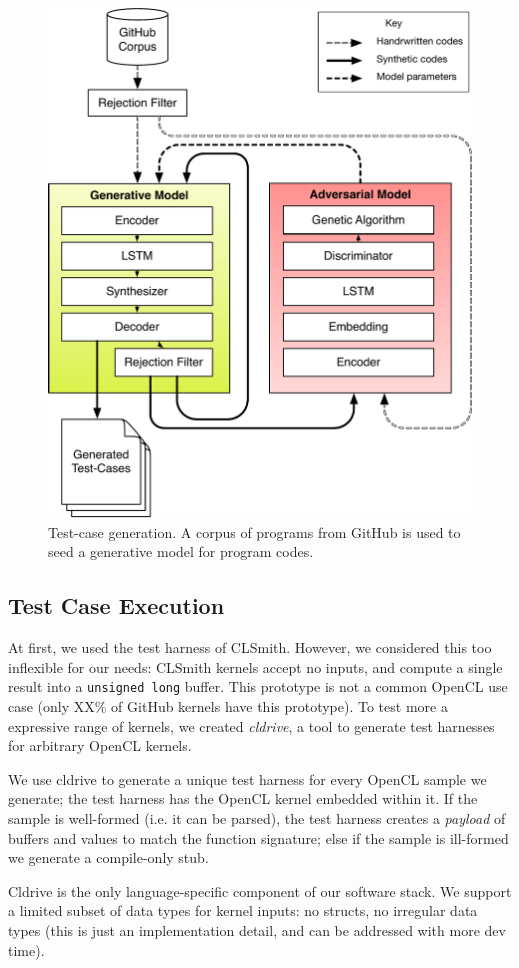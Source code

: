 \begin{figure}
  \centering
  \includegraphics[width=.95\columnwidth]{img/clgen} %
  \caption{%
    Test-case generation. A corpus of programs from GitHub is used to seed a generative model for program codes.%
  }%
  \label{fig:deeptune}
\end{figure}

\subsection{Test Case Execution}

At first, we used the test harness of CLSmith. However, we considered this too inflexible for our needs: CLSmith kernels accept no inputs, and compute a single result into a \texttt{unsigned long} buffer. This prototype is not a common OpenCL use case (only XX\% of GitHub kernels have this prototype). To test more a expressive range of kernels, we created \emph{cldrive}, a tool to generate test harnesses for arbitrary OpenCL kernels.

We use cldrive to generate a unique test harness for every OpenCL sample we generate; the test harness has the OpenCL kernel embedded within it. If the sample is well-formed (i.e. it can be parsed), the test harness creates a \emph{payload} of buffers and values to match the function signature; else if the sample is ill-formed we generate a compile-only stub. 

Cldrive is the only language-specific component of our software stack. We support a limited subset of data types for kernel inputs: no structs, no irregular data types (this is just an implementation detail, and can be addressed with more dev time).
